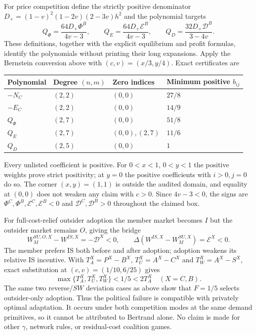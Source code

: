 For price competition define the strictly positive denominator
$D_+=(1-v)^2(1-2v)(2-3v)h^2$ and the polynomial targets
\[
Q_\Phi=\frac{64D_+\Phi^B}{4v-3},\qquad
Q_E=\frac{64D_+\mathscr E^B}{4v-3},\qquad
Q_D=\frac{32D_+\mathscr D^B}{3-4v}.
\]
These definitions, together with the explicit equilibrium and profit formulas,
identify the polynomials without printing their long expansions. Apply the
Bernstein conversion above with $(c,v)=(x/3,y/4)$. Exact certificates are
\begin{center}\small
\begin{tabular}{@{}llll@{}}\toprule
Polynomial & Degree $(n,m)$ & Zero indices & Minimum positive $b_{ij}$\\\midrule
$-N_C$ & $(2,2)$ & $(0,0)$ & $27/8$\\
$-E_C$ & $(2,2)$ & $(0,0)$ & $14/9$\\
$Q_\Phi$ & $(2,7)$ & $(0,0)$ & $51/8$\\
$Q_E$ & $(2,7)$ & $(0,0),(2,7)$ & $11/6$\\
$Q_D$ & $(2,5)$ & $(0,0)$ & $1$\\\bottomrule
\end{tabular}\end{center}
Every unlisted coefficient is positive. For $0<x<1$, $0<y<1$ the
positive weights prove strict positivity; at $y=0$ the positive coefficients
with $i>0,j=0$ do so. The corner $(x,y)=(1,1)$ is outside the audited
domain, and equality at $(0,0)$ does not weaken any claim with $c>0$.
Since $4v-3<0$, the signs are
$\Phi^C,\Phi^B,\mathscr E^C,\mathscr E^B<0$ and
$\mathscr D^C,\mathscr D^B>0$ throughout the claimed box.

For full-cost-relief outsider adoption the member market becomes $I$ but the
outsider market remains $O$, giving the bridge
\[
W_M^{SU,O,X}-W^{IS,X}=-\mathscr D^X<0,\qquad
\Delta(W^{IS,X}-W_M^{SU,X})=\mathscr E^X<0.
\]
The member prefers IS both before and after adoption; adoption weakens its
relative IS incentive. With $T_A^X=P^X-B^X$, $T_U^X=A^X-C^X$ and
$T_W^X=A^X-S^X$, exact substitution at $(c,v)=(1/10,6/25)$ gives
\[
\max\{T_A^X,T_U^X,T_W^X\}<1/5<2T_A^X
\quad(X=C,B).
\]
The same two reverse/$SW$ deviation cases as above show that $F=1/5$
selects outsider-only adoption. Thus the political failure is compatible
with privately optimal adaptation. It occurs under both competition modes
at the same demand primitives, so it cannot be attributed to Bertrand alone.
No claim is made for other $\gamma$, network rules, or residual-cost
coalition games.

